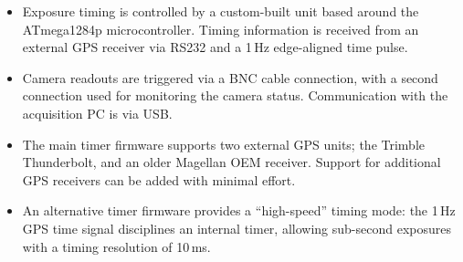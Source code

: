 \vspace{-1.75cm}
\begin{itemize}[itemsep=20pt]

\item[] Exposure timing is controlled by a custom-built unit based around the
ATmega1284p microcontroller. Timing information is received from an external
GPS receiver via RS232 and a 1\,Hz edge-aligned time pulse.

\item[] Camera readouts are triggered via a BNC cable connection, with a second
connection used for monitoring the camera status. Communication with the
acquisition PC is via USB.

\item[] The main timer firmware supports two external GPS units; the
Trimble Thunderbolt, and an older Magellan OEM receiver. Support for additional
GPS receivers can be added with minimal effort.

\item[] An alternative timer firmware provides a ``high-speed'' timing mode:
the 1\,Hz GPS time signal disciplines an internal timer,
allowing sub-second exposures with a timing resolution of 10\,ms.

\end{itemize}
\vspace{-1.75cm}